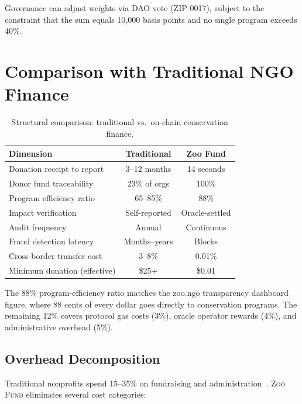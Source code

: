 \documentclass[11pt,letterpaper]{article}
\newcommand{\ZooFund}{\textsc{Zoo Fund}}
\begin{document}
Governance can adjust weights via DAO vote (ZIP-0017), subject to the constraint that the sum equals 10{,}000 basis points and no single program exceeds 40\%.

\section{Comparison with Traditional NGO Finance}
\label{sec:comparison}

\begin{table}[t]
\centering
\begin{tabular}{lcc}
\toprule
\textbf{Dimension} & \textbf{Traditional} & \textbf{Zoo Fund} \\
\midrule
Donation receipt to report & 3--12 months & 14 seconds \\
Donor fund traceability & 23\% of orgs & 100\% \\
Program efficiency ratio & 65--85\% & 88\% \\
Impact verification & Self-reported & Oracle-settled \\
Audit frequency & Annual & Continuous \\
Fraud detection latency & Months--years & Blocks \\
Cross-border transfer cost & 3--8\% & 0.01\% \\
Minimum donation (effective) & \$25+ & \$0.01 \\
\bottomrule
\end{tabular}
\caption{Structural comparison: traditional vs.\ on-chain conservation finance.}
\label{tab:comparison}
\end{table}

The 88\% program-efficiency ratio matches the zoo.ngo transparency dashboard figure, where 88 cents of every dollar goes directly to conservation programs. The remaining 12\% covers protocol gas costs (3\%), oracle operator rewards (4\%), and administrative overhead (5\%).

\subsection{Overhead Decomposition}

Traditional nonprofits spend 15--35\% on fundraising and administration~\cite{charitynavigator2023}. \ZooFund{} eliminates several cost categories:
\end{document}
